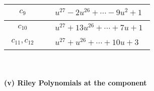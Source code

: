 \documentclass[1p]{elsarticle_modified}
\theoremstyle{definition}
\begin{document}
\begin{tabular}{m{50pt}|m{274pt}}
\hline $$\begin{aligned}c_{9}\end{aligned}$$&$\begin{aligned}
&u^{27}-2 u^{26}+\cdots-9 u^2+1
\end{aligned}$\\
\hline $$\begin{aligned}c_{10}\end{aligned}$$&$\begin{aligned}
&u^{27}+13 u^{26}+\cdots+7 u+1
\end{aligned}$\\
\hline $$\begin{aligned}c_{11},c_{12}\end{aligned}$$&$\begin{aligned}
&u^{27}+u^{26}+\cdots+10 u+3
\end{aligned}$\\
\hline
\end{tabular}\\~\\
\newpage\renewcommand{\arraystretch}{1}
\flushleft \textbf{(v) Riley Polynomials at the component}\newline \\
\end{document}
